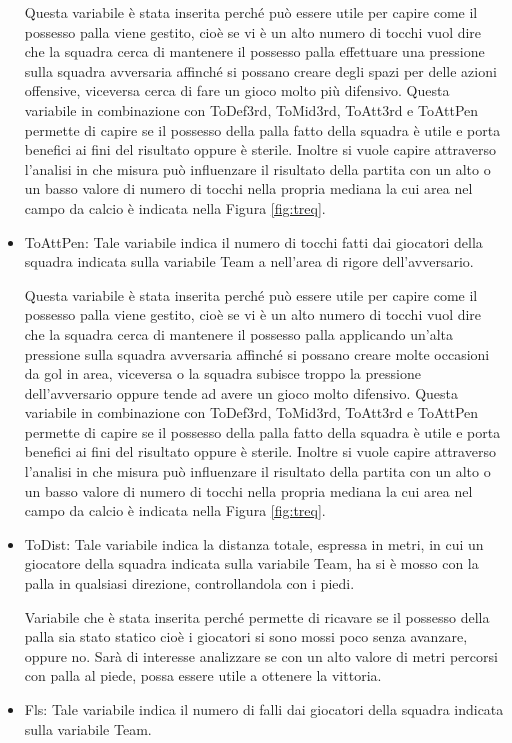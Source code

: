 \begin{itemize}
	Questa variabile è stata inserita perché può essere utile per capire come il possesso palla viene gestito, cioè se vi è un alto numero di tocchi vuol dire che la squadra cerca di mantenere il possesso palla effettuare una pressione sulla squadra avversaria affinché si possano creare degli spazi per delle azioni offensive, viceversa cerca di fare un gioco molto più difensivo. Questa variabile in combinazione con \textsf{ToDef3rd}, \textsf{ToMid3rd}, \textsf{ToAtt3rd} e \textsf{ToAttPen} permette di capire se il possesso della palla fatto della squadra è utile e porta benefici ai fini del risultato oppure è sterile. Inoltre si vuole capire attraverso l'analisi in che misura può influenzare il risultato della partita con un alto o un basso valore di numero di tocchi nella propria mediana la cui area nel campo da calcio è indicata nella Figura \ref{fig:treq}.
	\item \textsf{ToAttPen}: Tale variabile indica il numero di tocchi fatti dai giocatori della squadra indicata sulla variabile \textsf{Team} a nell'area di rigore dell'avversario. 
	
	Questa variabile è stata inserita perché può essere utile per capire come il possesso palla viene gestito, cioè se vi è un alto numero di tocchi vuol dire che la squadra cerca di mantenere il possesso palla applicando un'alta pressione sulla squadra avversaria affinché si possano creare molte occasioni da gol in area, viceversa o la squadra subisce troppo la pressione dell'avversario oppure tende ad avere un gioco molto difensivo. Questa variabile in combinazione con \textsf{ToDef3rd}, \textsf{ToMid3rd}, \textsf{ToAtt3rd} e \textsf{ToAttPen} permette di capire se il possesso della palla fatto della squadra è utile e porta benefici ai fini del risultato oppure è sterile. Inoltre si vuole capire attraverso l'analisi in che misura può influenzare il risultato della partita con un alto o un basso valore di numero di tocchi nella propria mediana la cui area nel campo da calcio è indicata nella Figura \ref{fig:treq}.
	\item \textsf{ToDist}: Tale variabile indica la distanza totale, espressa in metri, in cui un giocatore della squadra indicata sulla variabile \textsf{Team}, ha si è mosso con la palla in qualsiasi direzione, controllandola con i piedi.
	
	Variabile che è stata inserita perché permette di ricavare se il possesso della palla sia stato statico cioè i giocatori si sono mossi poco senza avanzare, oppure no. Sarà di interesse analizzare se con un alto valore di metri percorsi con palla al piede, possa essere utile a ottenere la vittoria.
	\item \textsf{Fls}: Tale variabile indica il numero di falli dai giocatori della squadra indicata sulla variabile \textsf{Team}. 
	

\end{itemize}
